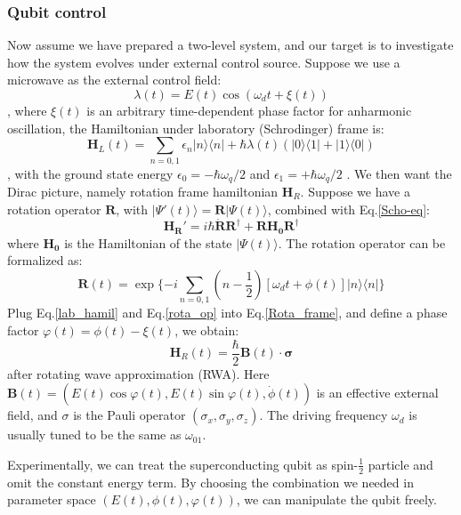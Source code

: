 \subsubsection{Qubit control}
Now assume we have prepared a two-level system, and our target is to investigate how the system evolves under external control source\cite{RN11}. Suppose we use a microwave as the external control field:
\begin{equation}
\lambda (t) = E(t) \cos{(\omega_d t + \xi(t))}    
\end{equation}
, where  $\xi(t)$ is an arbitrary time-dependent phase factor for anharmonic oscillation, the Hamiltonian under laboratory (Schrodinger) frame is:
\begin{equation}\label{lab_hamil}
    \mathbf{H}_L(t) = \sum_{n=0,1} \epsilon_n |n\rangle\langle n| + \hbar\lambda(t) (|0\rangle\langle 1| + |1\rangle\langle 0 |)
\end{equation}
, with the ground state energy $\epsilon_0 = -\hbar\omega_q/2$ and $\epsilon_1 = +\hbar\omega_q/2$ .
We then want the Dirac picture, namely rotation frame hamiltonian $\mathbf{H}_R$. Suppose we have a rotation operator $\mathbf{R}$, with $|\Psi ' (t)\rangle = \mathbf{R}|\Psi(t)\rangle$, combined with Eq.\ref{Scho-eq}:
\begin{equation}\label{Rota_frame}
    \mathbf{H_R'} = i\hbar \mathbf{\dot{R}{R^\dagger}} + \mathbf{RH_0{R^\dagger}}
\end{equation}
where $\mathbf{H_0}$ is the Hamiltonian of the state $|\Psi (t)\rangle$. The rotation operator can be formalized as:
\begin{equation}\label{rota_op}
    \mathbf{R}(t) = \exp\{ -i\sum_{n=0,1} (n-\frac{1}{2}) [\omega_d t + \phi (t)] |n\rangle\langle n|\}
\end{equation}
Plug Eq.\ref{lab_hamil} and Eq.\ref{rota_op} into Eq.\ref{Rota_frame}, and define a phase factor $\varphi (t) = \phi (t) - \xi (t)$, we obtain:
\begin{equation}\label{TLScontrolH}
    \mathbf{H}_R (t) = \frac{\hbar}{2}\mathbf{B}(t) \cdot \mathbf{\sigma}
\end{equation}
after rotating wave approximation (RWA). Here $\mathbf{B}(t) = (E(t)\cos{\varphi(t)}, E(t)\sin{\varphi(t)}, \dot\phi(t))$ is an effective external field, and $\sigma$ is the Pauli operator $(\sigma_x, \sigma_y, \sigma_z)$. The driving frequency $\omega_d$ is usually tuned to be the same as $\omega_{01}$.

Experimentally, we can treat the superconducting qubit as spin-$\frac{1}{2}$ particle and omit the constant energy term. By choosing the combination we needed in parameter space $(E(t), \phi (t), \varphi (t))$, we can manipulate the qubit freely.

